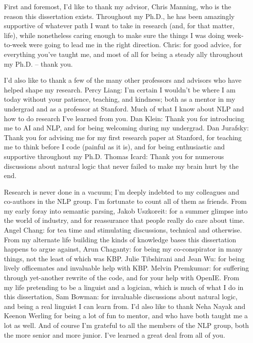 
First and foremost, I'd like to thank my advisor, Chris Manning, who is the reason this dissertation
  exists.
Throughout my Ph.D., he has been amazingly supportive of whatever path I want to take
  in research (and, for that matter, life), while nonetheless caring enough to make sure the things
  I was doing week-to-week were going to lead me in the right direction.
Chris: for good advice, for everything you've taught me, and most of all for being a steady ally
  throughout my Ph.D. -- thank you.

I'd also like to thank a few of the many other professors and advisors who have helped shape my research.
Percy Liang: I'm certain I wouldn't be where I am today without your patience, teaching, and kindness; both
  as a mentor in my undergrad and as a professor at Stanford.
Much of what I know about NLP and how to do research I've learned from you.
Dan Klein: Thank you for introducing me to AI and NLP, and for being welcoming during my undergrad.
Dan Jurafsky: Thank you for advising me for my first research paper at Stanford, for teaching me
  to think before I code (painful as it is), and for being enthusiastic and supportive throughout
  my Ph.D.
Thomas Icard: Thank you for numerous discussions about natural logic that never failed to make
  my brain hurt by the end.

Research is never done in a vacuum; I'm deeply indebted to my colleagues and co-authors in the
  NLP group.
I'm fortunate to count all of them as friends.
From my early foray into semantic parsing,
  Jakob Uszkoreit: for a summer glimpse into the world of industry, and for reassurance
  that people really do care about time.
Angel Chang: for tea time and stimulating discussions, technical
  and otherwise.
From my alternate life building the kinds of knowledge bases this dissertation happens
  to argue against,
Arun Chaganty: for being my co-conspirator in many things, not the least of which was KBP.
Julie Tibshirani and Jean Wu: for being lively officemates and invaluable help with KBP.
Melvin Premkumar: for suffering through yet-another rewrite of the code, and for
  your help with OpenIE.
From my life pretending to be a linguist and a logician, which is much of what I do in this
  dissertation,
Sam Bowman: for invaluable discussions about natural logic, and being a real linguist I can learn from.
I'd also like to thank Neha Nayak and Keenon Werling for being a lot of fun to mentor,
  and who have both taught me a lot as well.
And of course I'm grateful to all the members of the NLP group, both the more senior and more junior.
I've learned a great deal from all of you.

